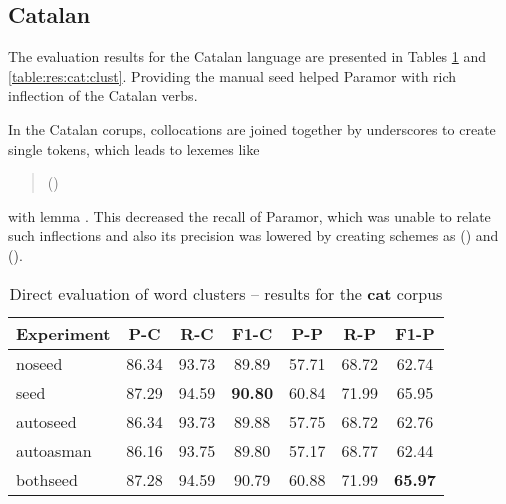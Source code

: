 \subsection{Catalan}
The evaluation results for the Catalan language are presented in Tables \ref{table:res:cat:direct} and \ref{table:res:cat:clust}. Providing the manual seed helped Paramor with rich inflection of the Catalan verbs.

In the Catalan corups, collocations are joined together by underscores to create single tokens, which leads to lexemes like \begin{quote}()\end{quote} with lemma . This decreased the recall of Paramor, which was unable to relate such inflections and also its precision was lowered by creating schemes as () and ().

\begin{table}[p]
\begin{center}
\begin{tabular}{lcccccc}
\toprule
\bf Experiment & \bf P-C & \bf R-C & \bf F1-C & \bf P-P & \bf R-P & \bf F1-P\\
\midrule
noseed & 86.34 & 93.73 & 89.89 & 57.71 & 68.72 & 62.74\\
seed & 87.29 & 94.59 & \bf 90.80 & 60.84 & 71.99 & 65.95\\
autoseed & 86.34 & 93.73 & 89.88 & 57.75 & 68.72 & 62.76\\
autoasman & 86.16 & 93.75 & 89.80 & 57.17 & 68.77 & 62.44\\
bothseed & 87.28 & 94.59 & 90.79 & 60.88 & 71.99 & \bf 65.97\\
\bottomrule
\end{tabular}
\end{center}
\caption{\label{table:res:cat:direct} Direct evaluation of word clusters -- results for the \textbf{cat} corpus}
\end{table}

